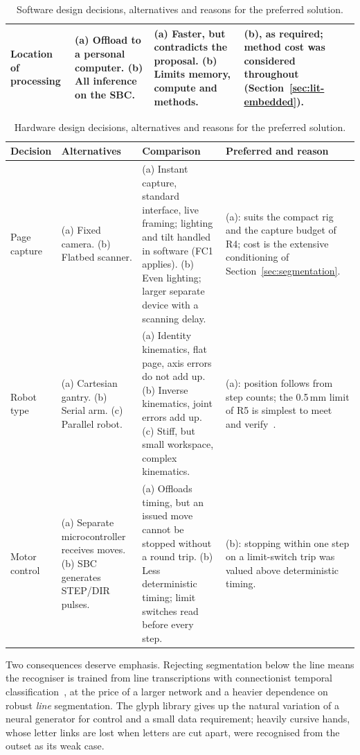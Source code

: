 \begin{table}[htbp]
\begin{tabular}{|p{1.6cm}|p{3.4cm}|p{4.3cm}|p{4.3cm}|}
\hline
Location of processing & (a) Offload to a personal computer. (b) All inference on the SBC. & (a) Faster, but contradicts the proposal. (b) Limits memory, compute and methods. & (b), as required; method cost was considered throughout (Section~\ref{sec:lit-embedded}). \\
\hline
\end{tabular}
\caption{Software design decisions, alternatives and reasons for the preferred solution.}
\label{tab:app-software}
\end{table}

\begin{table}[htbp]
\centering
\fontsize{9}{10.5}\selectfont
\begin{tabular}{|p{1.6cm}|p{3.4cm}|p{4.3cm}|p{4.3cm}|}
\hline
\textbf{Decision} & \textbf{Alternatives} & \textbf{Comparison} & \textbf{Preferred and reason} \\
\hline
Page capture & (a) Fixed camera. (b) Flatbed scanner. & (a) Instant capture, standard interface, live framing; lighting and tilt handled in software (FC1 applies). (b) Even lighting; larger separate device with a scanning delay. & (a): suits the compact rig and the capture budget of R4; cost is the extensive conditioning of Section~\ref{sec:segmentation}. \\
\hline
Robot type & (a) Cartesian gantry. (b) Serial arm. (c) Parallel robot. & (a) Identity kinematics, flat page, axis errors do not add up. (b) Inverse kinematics, joint errors add up. (c) Stiff, but small workspace, complex kinematics. & (a): position follows from step counts; the 0.5\,mm limit of R5 is simplest to meet and verify~\cite{teikari2016}. \\
\hline
Motor control & (a) Separate microcontroller receives moves. (b) SBC generates STEP/DIR pulses. & (a) Offloads timing, but an issued move cannot be stopped without a round trip. (b) Less deterministic timing; limit switches read before every step. & (b): stopping within one step on a limit-switch trip was valued above deterministic timing. \\
\hline
\end{tabular}
\caption{Hardware design decisions, alternatives and reasons for the preferred solution.}
\label{tab:app-hardware}
\end{table}

Two consequences deserve emphasis. Rejecting segmentation below the line means the recogniser is trained from line transcriptions with connectionist temporal classification~\cite{graves2006}, at the price of a larger network and a heavier dependence on robust \emph{line} segmentation. The glyph library gives up the natural variation of a neural generator for control and a small data requirement; heavily cursive hands, whose letter links are lost when letters are cut apart, were recognised from the outset as its weak case.

